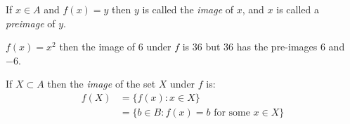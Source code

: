\documentclass[../main.tex]{subfiles}
\begin{document}
\begin{definition}
  If $x \in A$ and $f(x) = y$ then $y$ is called the \textit{image} of $x$, and $x$ is called a \textit{preimage} of $y$.
\end{definition}
\begin{example}
  $f(x) = x^2$ then the image of $6$ under $f$ is $36$ but $36$ has the pre-images $6$ and $-6$.
\end{example}
If $X \subset A$ then the \textit{image} of the set $X$ under $f$ is:
\begin{align*}
  f(X) &= \{f(x): x \in X\} \\
       &= \{b \in B: f(x) = b \text{ for some } x \in X\}
\end{align*}
\end{document}
